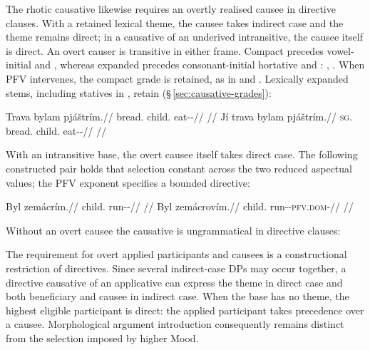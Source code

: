 The rhotic causative likewise requires an overtly realised causee in
directive clauses. With a retained lexical theme, the causee takes indirect case
and the theme remains direct; in a causative of an underived intransitive, the
causee itself is direct. An overt causer is transitive in either frame.
Compact  precedes vowel-initial  and ,
whereas expanded  precedes consonant-initial hortative
 and : , .
When PFV  intervenes, the compact grade is retained, as in
 and . Lexically expanded stems,
including statives in , retain 
(§\,\ref{sec:causative-grades}):

\pex\label{ex:val-directive-caus}
\a
\begingl
\gla Trava bylam pjáštrím.//
\glb bread.\Dir{} child.\Ind{} eat-\Caus{}-\Imp{}//
\glft {} //
\endgl
\a
\begingl
\gla Jí trava bylam pjáštrím.//
\textsc{sg}.\Trs{} bread.\Dir{} child.\Ind{} eat-\Caus{}-\Imp{}//
\glft {} //
\endgl
\xe

With an intransitive base, the overt causee itself takes direct case. The
following constructed pair holds that selection constant across the two
reduced aspectual values; the PFV exponent specifies a bounded directive:

\pex\label{ex:val-directive-caus-intr}
\a
\begingl
\gla Byl zemácrím.//
\glb child.\Dir{} run-\Caus{}-\Imp{}//
\glft {} //
\endgl
\a
\begingl
\gla Byl zemácrovím.//
\glb child.\Dir{} run-\Caus{}-\textsc{pfv.dom}-\Imp{}//
\glft {} //
\endgl
\xe

\noindent Without an overt causee the causative is ungrammatical in directive clauses:

\pex
{}  
\xe

The requirement for overt applied participants and causees is a constructional
restriction of directives. Since several indirect-case DPs may occur together,
a directive causative of an applicative can express the theme in direct case
and both beneficiary and causee in indirect case. When the base has no theme,
the highest eligible participant is direct: the applied participant takes
precedence over a causee. Morphological argument introduction consequently
remains distinct from the selection imposed by higher Mood.

